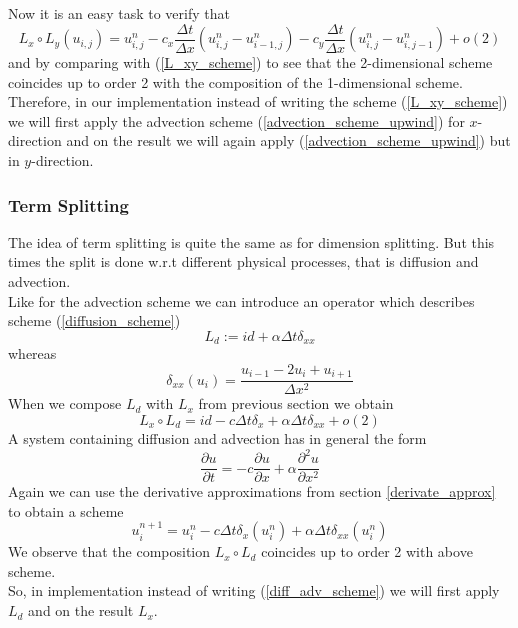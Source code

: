 \documentclass[]{article}
\begin{document}
Now it is an easy task to verify that 
\begin{equation*}
L_{x}\circ L_{y}(u_{i,j})=u_{i,j}^{n}-c_{x}\frac{\Delta t}{\Delta x}(u_{i,j}^{n}-u_{i-1,j}^{n})
-c_{y}\frac{\Delta t}{\Delta x}(u_{i,j}^{n}-u_{i,j-1}^{n}) +o(2)
\end{equation*}
and by comparing with (\ref{L_xy_scheme}) to see that the 2-dimensional scheme coincides 
up to order 2 with the composition of the 1-dimensional scheme.\\
Therefore, in our implementation instead of writing the scheme (\ref{L_xy_scheme}) we will first apply the advection scheme (\ref{advection_scheme_upwind}) for $x$-direction and on the result we will again apply (\ref{advection_scheme_upwind}) but in $y$-direction.

\subsubsection{Term Splitting}
The idea of term splitting is quite the same as for dimension splitting. But this times the split is done w.r.t different physical processes, that is diffusion and advection.\\
Like for the advection scheme we can introduce an operator which describes scheme (\ref{diffusion_scheme})
\begin{equation*}
L_{d}:=id+\alpha\Delta t\delta_{xx}
\end{equation*}
whereas
\begin{equation*}
\delta_{xx}(u_{i})=\frac{u_{i-1}-2u_{i}+u_{i+1}}{\Delta x^2}
\end{equation*}
When we compose $L_{d}$ with $L_{x}$ from previous section we obtain
\begin{equation*}
L_{x}\circ L_{d}=id-c\Delta t\delta_{x}+\alpha\Delta t\delta_{xx}+o(2)
\end{equation*}
A system containing diffusion and advection has in general the form
\begin{equation*}
\frac{\partial u}{\partial t} = -c\frac{\partial u}{\partial x}+\alpha\frac{\partial^2 u}{\partial x^2}
\end{equation*}
Again we can use the derivative approximations from section \ref{derivate_approx} to obtain a scheme
\begin{equation} \label{diff_adv_scheme}
u_{i}^{n+1}=u_{i}^{n}-c\Delta t\delta_{x}(u_{i}^{n})+\alpha\Delta t\delta_{xx}(u_{i}^{n})
\end{equation}
We observe that the composition $L_{x}\circ L_{d}$ coincides up to order 2 with above scheme.\\
So, in implementation instead of writing (\ref{diff_adv_scheme}) we will first apply $L_{d}$ and on the result $L_{x}$.
\end{document}
